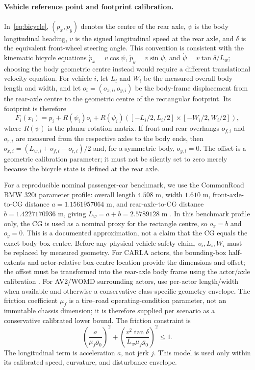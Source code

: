 \documentclass[letterpaper]{article} %
\begin{document}
\paragraph{Vehicle reference point and footprint calibration.}
In~\eqref{eq:bicycle}, $(p_x,p_y)$ denotes the centre of the rear axle,
$\psi$ is the body longitudinal heading, $v$ is the signed longitudinal
speed at the rear axle, and $\delta$ is the equivalent front-wheel steering
angle. This convention is consistent with the kinematic bicycle equations
$\dot p_x=v\cos\psi$, $\dot p_y=v\sin\psi$, and
$\dot\psi=v\tan\delta/L_w$; choosing the body geometric centre instead
would require a different translational velocity equation. For vehicle $i$,
let $L_i$ and $W_i$ be the measured overall body length and width, and let
$o_i=(o_{x,i},o_{y,i})$ be the body-frame displacement from the rear-axle
centre to the geometric centre of the rectangular footprint. Its footprint is
therefore
\begin{equation}
F_i(x_i)=p_i+R(\psi_i)o_i+R(\psi_i)
\left([-L_i/2,L_i/2]\times[-W_i/2,W_i/2]\right),
\label{eq:rear-axle-footprint}
\end{equation}
where $R(\psi)$ is the planar rotation matrix. If front and rear overhangs
$o_{f,i}$ and $o_{r,i}$ are measured from the respective axles to the body
ends, then $o_{x,i}=(L_{w,i}+o_{f,i}-o_{r,i})/2$ and, for a symmetric
body, $o_{y,i}=0$. The offset is a geometric calibration parameter; it must
not be silently set to zero merely because the bicycle state is defined at
the rear axle.

For a reproducible nominal passenger-car benchmark, we use the CommonRoad
BMW 320i parameter profile: overall length $4.508$ m, width $1.610$ m,
front-axle-to-CG distance $a=1.1561957064$ m, and rear-axle-to-CG distance
$b=1.4227170936$ m, giving $L_w=a+b=2.5789128$ m
\citep{kochdumper2021verification,commonroad2025vehicleparams}. In this
benchmark profile only, the CG is used as a nominal proxy for the rectangle
centre, so $o_x=b$ and $o_y=0$. This is a documented approximation, not a
claim that the CG equals the exact body-box centre. Before any physical
vehicle safety claim, $o_i,L_i,W_i$ must be replaced by measured geometry.
For CARLA actors, the bounding-box half-extents and actor-relative box-centre
location provide the dimensions and offset; the offset must be transformed
into the rear-axle body frame using the actor/axle calibration
\citep{carla2026pythonapi}. For AV2/WOMD surrounding actors, use per-actor
length/width when available and otherwise a conservative class-specific
geometry envelope. The friction coefficient $\mu_f$ is a tire--road
operating-condition parameter, not an immutable chassis dimension; it is
therefore supplied per scenario as a conservative calibrated lower bound. The friction constraint is
\begin{equation}
\left(\frac{a}{\mu_f g_0}\right)^2+
\left(\frac{v^2\tan\delta}{L_w\mu_f g_0}\right)^2\leq1.
\label{eq:friction}
\end{equation}
The longitudinal term is acceleration $a$, not jerk $j$. This model is used
only within its calibrated speed, curvature, and disturbance envelope.
\end{document}
